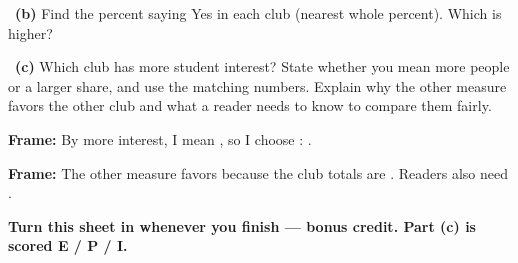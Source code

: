 \documentclass[11pt]{article}
\begin{document}
~\textbf{(b)} Find the percent saying Yes in each club (nearest whole percent). Which is higher?\par
\workspace{1.4in}

~\textbf{(c)} Which club has more student interest? State whether you mean more people or a larger share, and use the matching numbers. Explain why the other measure favors the other club and what a reader needs to know to compare them fairly.\par
\workspace{2.0in}

\begin{sentenceframebox}\raggedright\textbf{Frame:} By more interest, I mean \blank[1.5in], so I choose \blank[0.9in]: \blank[1.8in].\end{sentenceframebox}

\begin{sentenceframebox}\raggedright\textbf{Frame:} The other measure favors \blank[0.9in] because the club totals are \blank[1.4in]. Readers also need \blank[1.5in].\end{sentenceframebox}

\textbf{Turn this sheet in whenever you finish --- bonus credit. Part (c) is scored E / P / I.}\par
\end{document}
